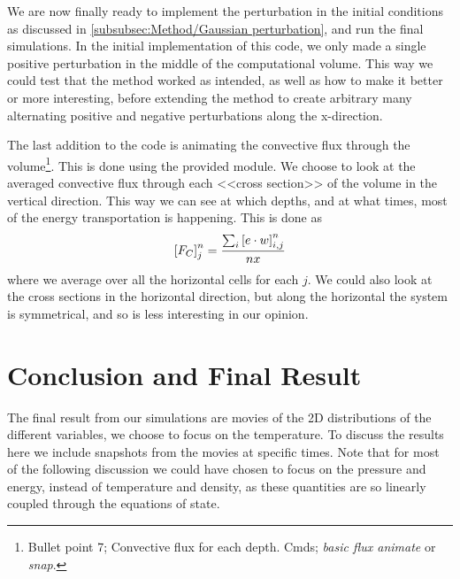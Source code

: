 \documentclass[11pt,a4paper,twocolumn,titlepage]{article}
\begin{document}
We are now finally ready to implement the perturbation in the initial conditions as discussed in \ref{subsubsec:Method/Gaussian perturbation}, and run the final simulations. In the initial implementation of this code, we only made a single positive perturbation in the middle of the computational volume. This way we could test that the method worked as intended, as well as how to make it better or more interesting, before extending the method to create arbitrary many alternating positive and negative perturbations along the x-direction.

The last addition to the code is animating the convective flux through the volume\footnote{Bullet point 7; Convective flux for each depth. Cmds; \textit{basic flux animate} or \textit{snap}.}. This is done using the provided module. We choose to look at the averaged convective flux through each <<cross section>> of the volume in the vertical direction. This way we can see at which depths, and at what times, most of the energy transportation is happening. This is done as
\begin{equation}
\qty[F_C]_{j}^{n} = \frac{\sum_i \qty[e\cdot w]_{i,j}^{n}}{nx}
\label{eq:FC_j}
\end{equation}
where we average over all the horizontal cells for each $j$. We could also look at the cross sections in the horizontal direction, but along the horizontal the system is symmetrical, and so is less interesting in our opinion.

\section{Conclusion and Final Result}\label{sec:Conclusion}
The final result from our simulations are movies of the 2D distributions of the different variables, we choose to focus on the temperature. To discuss the results here we include snapshots from the movies at specific times. Note that for most of the following discussion we could have chosen to focus on the pressure and energy, instead of temperature and density, as these quantities are so linearly coupled through the equations of state. 
\end{document}
